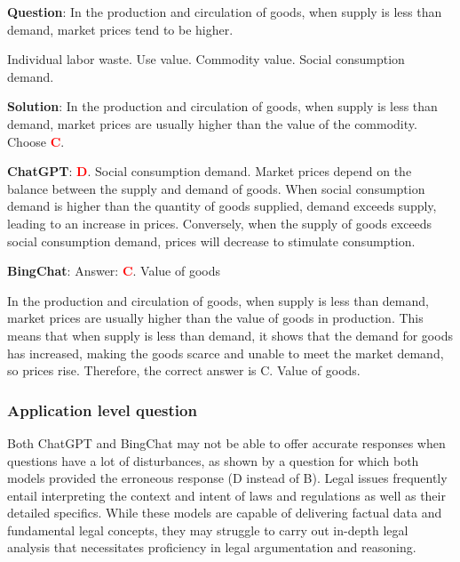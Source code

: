 \documentclass{article}
\begin{document}
{	
	
	\begin{mdframed}[linewidth=1pt,linecolor=red] \textbf{Question}: In the production and circulation of goods, when supply is less than demand, market prices tend to be higher.
		
		\begin{choices}
			\choice Individual labor waste.
			\choice Use value.
			\choice Commodity value.
			\choice Social consumption demand.
		\end{choices}
		
		\textbf{Solution}: In the production and circulation of goods, when supply is less than demand, market prices are usually higher than the value of the commodity.	Choose \textcolor{red}{\textbf{C}}.
		
		\textbf{ChatGPT}: \textcolor{red}{\textbf{D}}. Social consumption demand. Market prices depend on the balance between the supply and demand of goods. When social consumption demand is higher than the quantity of goods supplied, demand exceeds supply, leading to an increase in prices. Conversely, when the supply of goods exceeds social consumption demand, prices will decrease to stimulate consumption.
		
		\textbf{BingChat}: Answer: \textcolor{red}{\textbf{C}}. Value of goods
		
		In the production and circulation of goods, when supply is less than demand, market prices are usually higher than the value of goods in production. This means that when supply is less than demand, it shows that the demand for goods has increased, making the goods scarce and unable to meet the market demand, so prices rise. Therefore, the correct answer is C. Value of goods.
		
		
	\end{mdframed}	
	
	\subsubsection{Application level question}
	
	\label{VNHSGE_Civ_A}
	
	Both ChatGPT and BingChat may not be able to offer accurate responses when questions have a lot of disturbances, as shown by a question for which both models provided the erroneous response (D instead of B). Legal issues frequently entail interpreting the context and intent of laws and regulations as well as their detailed specifics. While these models are capable of delivering factual data and fundamental legal concepts, they may struggle to carry out in-depth legal analysis that necessitates proficiency in legal argumentation and reasoning.
	
}
\end{document}
